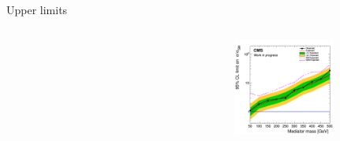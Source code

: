 \documentclass[8pt]{beamer}
\begin{document}
\begin{frame}{Upper limits}
\begin{columns}
\begin{column}{0.33\textwidth}
\begin{center}
    		\end{center}		
		\end{column}
		\begin{column}{0.33\textwidth}
			\begin{center}
     			\includegraphics[width=1.0\textwidth, height=90pt]{figs/limit_pseudo_2018_attempt7.png}
    		\end{center}		
		\end{column}
\end{columns} \vfill
\end{frame}
\end{document}
